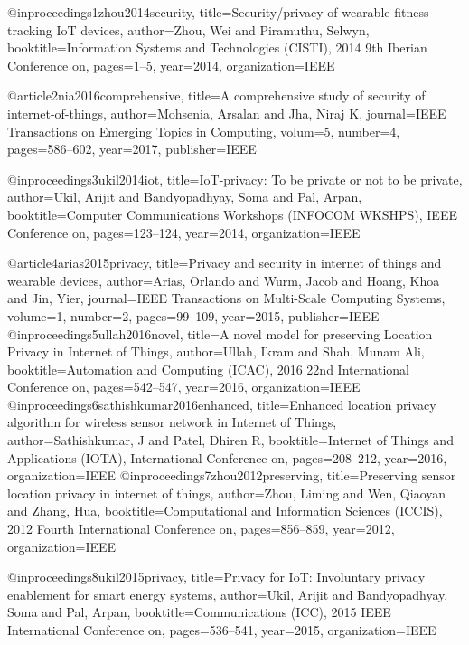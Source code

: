 {{{{%
@inproceedings{1zhou2014security,
	title={Security/privacy of wearable fitness tracking {I}o{T} devices},
	author={Zhou, Wei and Piramuthu, Selwyn},
	booktitle={Information Systems and Technologies (CISTI), 2014 9th Iberian Conference on},
	pages={1--5},
	year={2014},
	organization={IEEE}
}

@article{2nia2016comprehensive,
	title={A comprehensive study of security of internet-of-things},
	author={Mohsenia, Arsalan and Jha, Niraj K},
	journal={IEEE Transactions on Emerging Topics in Computing},
	volum={5},
	number={4},
	pages={586--602},
	year={2017},
	publisher={IEEE}
}

@inproceedings{3ukil2014iot,
	title={{I}o{T}-privacy: To be private or not to be private},
	author={Ukil, Arijit and Bandyopadhyay, Soma and Pal, Arpan},
	booktitle={Computer Communications Workshops (INFOCOM WKSHPS), IEEE Conference on},
	pages={123--124},
	year={2014},
	organization={IEEE}
}

@article{4arias2015privacy,
	title={Privacy and security in internet of things and wearable devices},
	author={Arias, Orlando and Wurm, Jacob and Hoang, Khoa and Jin, Yier},
	journal={IEEE Transactions on Multi-Scale Computing Systems},
	volume={1},
	number={2},
	pages={99--109},
	year={2015},
	publisher={IEEE}
}
@inproceedings{5ullah2016novel,
	title={A novel model for preserving Location Privacy in Internet of Things},
	author={Ullah, Ikram and Shah, Munam Ali},
	booktitle={Automation and Computing (ICAC), 2016 22nd International Conference on},
	pages={542--547},
	year={2016},
	organization={IEEE}
}
@inproceedings{6sathishkumar2016enhanced,
	title={Enhanced location privacy algorithm for wireless sensor network in Internet of Things},
	author={Sathishkumar, J and Patel, Dhiren R},
	booktitle={Internet of Things and Applications (IOTA), International Conference on},
	pages={208--212},
	year={2016},
	organization={IEEE}
}
@inproceedings{7zhou2012preserving,
	title={Preserving sensor location privacy in internet of things},
	author={Zhou, Liming and Wen, Qiaoyan and Zhang, Hua},
	booktitle={Computational and Information Sciences (ICCIS), 2012 Fourth International Conference on},
	pages={856--859},
	year={2012},
	organization={IEEE}
}

@inproceedings{8ukil2015privacy,
	title={Privacy for {I}o{T}: Involuntary privacy enablement for smart energy systems},
	author={Ukil, Arijit and Bandyopadhyay, Soma and Pal, Arpan},
	booktitle={Communications (ICC), 2015 IEEE International Conference on},
	pages={536--541},
	year={2015},
	organization={IEEE}
}

}}}}
